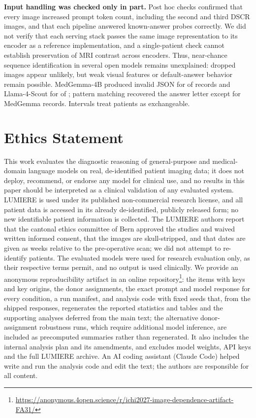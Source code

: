 \documentclass[conference]{IEEEtran}
\begin{document}
\textbf{Input handling was checked only in part.} Post hoc checks confirmed that every image increased prompt token count, including the second and third DSCR images, and that each pipeline answered known-answer probes correctly. We did not verify that each serving stack passes the same image representation to its encoder as a reference implementation, and a single-patient check cannot establish preservation of MRI contrast across encoders. Thus, near-chance sequence identification in several open models remains unexplained: dropped images appear unlikely, but weak visual features or default-answer behavior remain possible. MedGemma-4B produced invalid JSON for \vfourParseInvalidMedGemma{} of \vfourParseNMedGemma{} records and Llama-4-Scout for \vfourParseInvalidScout{} of \vfourParseNScout{}; pattern matching recovered the answer letter except for \vfourParseNoLetterMedGemma{} MedGemma records. Intervals treat patients as exchangeable.

\section*{Ethics Statement}

This work evaluates the diagnostic reasoning of general-purpose and medical-domain language models on real, de-identified patient imaging data; it does not deploy, recommend, or endorse any model for clinical use, and no results in this paper should be interpreted as a clinical validation of any evaluated system. LUMIERE is used under its published non-commercial research license, and all patient data is accessed in its already de-identified, publicly released form; no new identifiable patient information is collected. The LUMIERE authors report that the cantonal ethics committee of Bern approved the studies and waived written informed consent, that the images are skull-stripped, and that dates are given as weeks relative to the pre-operative scan; we did not attempt to re-identify patients. The evaluated models were used for research evaluation only, as their respective terms permit, and no output is used clinically. We provide an anonymous reproducibility artifact in an online repository\footnote{\url{https://anonymous.4open.science/r/ichi2027-image-dependence-artifact-FA31/}}: the items with keys and key origins, the donor assignments, the exact prompt and model response for every condition, a run manifest, and analysis code with fixed seeds that, from the shipped responses, regenerates the reported statistics and tables and the supporting analyses deferred from the main text; the alternative donor-assignment robustness runs, which require additional model inference, are included as precomputed summaries rather than regenerated. It also includes the internal analysis plan and its amendments, and excludes model weights, API keys and the full LUMIERE archive. An AI coding assistant (Claude Code) helped write and run the analysis code and edit the text; the authors are responsible for all content.
\end{document}
